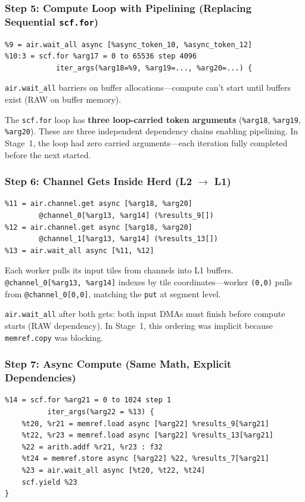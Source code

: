 \documentclass[11pt,a4paper]{article}
\begin{document}
\subsubsection{Step 5: Compute Loop with Pipelining (Replacing Sequential \texttt{scf.for})}
\begin{lstlisting}
%9 = air.wait_all async [%async_token_10, %async_token_12]
%10:3 = scf.for %arg17 = 0 to 65536 step 4096
            iter_args(%arg18=%9, %arg19=..., %arg20=...) {
\end{lstlisting}

\texttt{air.wait\_all} barriers on buffer allocations---compute can't start until
buffers exist (RAW on buffer memory).

The \texttt{scf.for} loop has \textbf{three loop-carried token arguments}
(\texttt{\%arg18}, \texttt{\%arg19}, \texttt{\%arg20}). These are three independent
dependency chains enabling pipelining. In Stage~1, the loop had zero carried
arguments---each iteration fully completed before the next started.

\subsubsection{Step 6: Channel Gets Inside Herd (L2 $\rightarrow$ L1)}
\begin{lstlisting}
%11 = air.channel.get async [%arg18, %arg20]
        @channel_0[%arg13, %arg14] (%results_9[])
%12 = air.channel.get async [%arg18, %arg20]
        @channel_1[%arg13, %arg14] (%results_13[])
%13 = air.wait_all async [%11, %12]
\end{lstlisting}

Each worker pulls its input tiles from channels into L1 buffers.
\texttt{@channel\_0[\%arg13, \%arg14]} indexes by tile coordinates---worker
\texttt{(0,0)} pulls from \texttt{@channel\_0[0,0]}, matching the \texttt{put} at
segment level.

\texttt{air.wait\_all} after both gets: both input DMAs must finish before compute
starts (RAW dependency). In Stage~1, this ordering was implicit because
\texttt{memref.copy} was blocking.

\subsubsection{Step 7: Async Compute (Same Math, Explicit Dependencies)}
\begin{lstlisting}
%14 = scf.for %arg21 = 0 to 1024 step 1
          iter_args(%arg22 = %13) {
    %t20, %r21 = memref.load async [%arg22] %results_9[%arg21]
    %t22, %r23 = memref.load async [%arg22] %results_13[%arg21]
    %22 = arith.addf %r21, %r23 : f32
    %t24 = memref.store async [%arg22] %22, %results_7[%arg21]
    %23 = air.wait_all async [%t20, %t22, %t24]
    scf.yield %23
}
\end{lstlisting}
\end{document}

